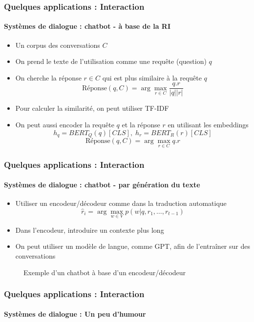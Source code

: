 \documentclass[xcolor=table]{beamer}
\begin{document}
\begin{frame}
	\frametitle{Quelques applications : Interaction}
	\framesubtitle{Systèmes de dialogue : chatbot - à base de la RI}
	
	\begin{itemize}
		\item Un corpus des conversations $C$
		\item On prend le texte de l'utilisation comme une requête (question) $q$
		\item On cherche la réponse $r \in C$ qui est plus similaire à la requête $q$
		\[\text{Réponse}(q, C) = \arg\max_{r \in C} \frac{q . r}{|q| |r|}\]
		\item Pour calculer la similarité, on peut utiliser TF-IDF
		\item On peut aussi encoder la requête $q$ et la réponse $r$ en utilisant les embeddings
		\[h_q = BERT_Q(q)[CLS],\; h_r = BERT_R(r)[CLS]\]
		\[\text{Réponse}(q, C) = \arg\max_{r \in C} q . r\]
	\end{itemize}
\end{frame}

\begin{frame}
	\frametitle{Quelques applications : Interaction}
	\framesubtitle{Systèmes de dialogue : chatbot - par génération du texte}
	
	\begin{itemize}
		\item Utiliser un encodeur/décodeur comme dans la traduction automatique
		\[ \hat{r}_i = \arg\max_{w \in V} p(w| q, r_1, \ldots, r_{t-1}) \]
		
		\item Dans l'encodeur, introduire un contexte plus long
		
		\item On peut utiliser un modèle de langue, comme GPT, afin de l'entraîner sur des conversations
	\end{itemize}
	
	\begin{figure}
		\centering
		\caption{Exemple d'un chatbot à base d'un encodeur/décodeur \cite{2020-jurafsky-martin}}
	\end{figure}
	
\end{frame}


\begin{frame}
	\frametitle{Quelques applications : Interaction}
	\framesubtitle{Systèmes de dialogue : Un peu d'humour}
	
	\begin{center}
	\end{center}
\end{frame}
\end{document}

